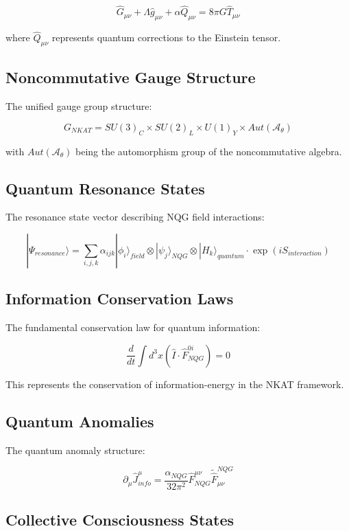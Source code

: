 \[
\hat{G}_{\mu\nu} + \Lambda \hat{g}_{\mu\nu} + \alpha \hat{Q}_{\mu\nu} = 8\pi G \hat{T}_{\mu\nu}
\]

where \(\hat{Q}_{\mu\nu}\) represents quantum corrections to the Einstein tensor.

\subsection{Noncommutative Gauge Structure}

The unified gauge group structure:

\[
G_{NKAT} = SU(3)_C \times SU(2)_L \times U(1)_Y \times Aut(\mathcal{A}_{\theta})
\]

with \(Aut(\mathcal{A}_{\theta})\) being the automorphism group of the noncommutative algebra.

\subsection{Quantum Resonance States}

The resonance state vector describing NQG field interactions:

\[
|\Psi_{resonance}\rangle = \sum_{i,j,k} \alpha_{ijk} |\phi_i\rangle_{field} \otimes |\psi_j\rangle_{NQG} \otimes |H_k\rangle_{quantum} \cdot \exp(iS_{interaction})
\]

\subsection{Information Conservation Laws}

The fundamental conservation law for quantum information:

\[
\frac{d}{dt}\int d^3x (\hat{I}\cdot\hat{F}^{0i}_{NQG}) = 0
\]

This represents the conservation of information-energy in the NKAT framework.

\subsection{Quantum Anomalies}

The quantum anomaly structure:

\[
\partial_{\mu}\hat{J}^{\mu}_{info} = \frac{\alpha_{NQG}}{32\pi^2}\hat{F}^{\mu\nu}_{NQG}\tilde{\hat{F}}_{\mu\nu}^{NQG}
\]

\subsection{Collective Consciousness States}

